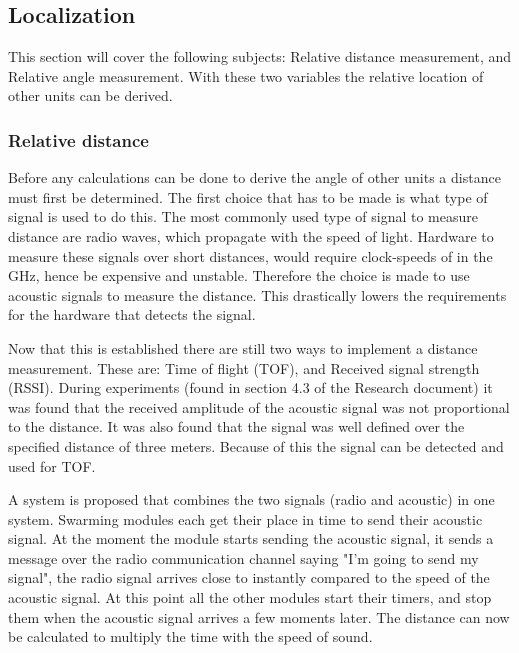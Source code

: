 \documentclass[10pt,a4paper]{article}
\begin{document}
\subsection{Localization}
This section will cover the following subjects: Relative distance measurement, and Relative angle measurement. With these two variables the relative location of other units can be derived. 

\subsubsection{Relative distance}
Before any calculations can be done to derive the angle of other units a distance must first be determined. The first choice that has to be made is what type of signal is used to do this. The most commonly used type of signal to measure distance are radio waves, which propagate with the speed of light. Hardware to measure these  signals over short distances, would require clock-speeds of in the GHz, hence be expensive and unstable. Therefore the choice is made to use acoustic signals to measure the distance. This drastically lowers the requirements for the hardware that detects the signal.

Now that this is established there are still two ways to implement a distance measurement. These are: Time of flight (TOF)\cite{TOF}, and Received signal strength (RSSI)\cite{RSSI}. During experiments (found in section 4.3 of the Research document) it was found that the received amplitude of the acoustic signal was not proportional to the distance. It was also found that the signal was well defined over the specified distance of three meters. Because of this the signal can be detected and used for TOF.

A system is proposed that combines the two signals (radio and acoustic) in one system. Swarming modules each get their place in time to send their acoustic signal. At the moment the module starts sending the acoustic signal, it sends a message over the radio communication channel saying "I'm going to send my signal", the radio signal arrives close to instantly compared to the speed of the acoustic signal. At this point all the other modules start their timers, and stop them when the acoustic signal arrives a few moments later. The distance can now be calculated to multiply the time with the speed of sound.
\end{document}

